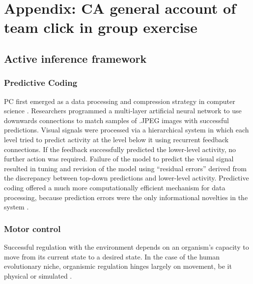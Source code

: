\chapter{\label{app2:theory}Appendix: CA general account of team click in group exercise}

\begin{CJK}{UTF8}{gbsn}



\section{Active inference framework}

\subsection{Predictive Coding\label{app2:predictiveCoding}}
PC first emerged as a data processing and compression strategy in computer science \citep{Rao1999}.  Researchers programmed a multi-layer artificial neural network to use downwards connections to match samples of .JPEG images with successful predictions. Visual signals were processed via a hierarchical system in which each level tried to predict activity at the level below it using recurrent feedback connections. If the feedback successfully predicted the lower-level activity, no further action was required. Failure of the model to predict the visual signal resulted in tuning and revision of the model using ``residual errors'' derived from the discrepancy between top-down predictions and lower-level activity.  Predictive coding offered a much more computationally efficient mechanism for data processing, because prediction errors were the only informational novelties in the system \citep{Clark2015}.

\subsection{Motor control\label{app2:motorControl}}
Successful regulation with the environment depends on an organism's capacity to move from its current state to a desired state.  In the case of the human evolutionary niche, organismic regulation hinges largely on movement, be it physical or simulated \citep{Wolpert1995}.


\end{CJK}
